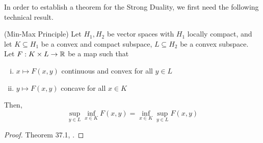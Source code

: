 \documentclass[../main.tex]{subfiles}
\begin{document}
In order to establish a theorem for the Strong Duality, we first need the following technical result.

\begin{lemma}
\label{lemma:min_max_principle}
    (Min-Max Principle) Let $H_1, H_2$ be vector spaces with $H_1$ locally compact, and let $K\subseteq H_1$ be a convex and compact subspace, $L\subseteq H_2$ be a convex subspace. Let $F: K\times L\to \mathbb{R}$ be a map such that
    \begin{enumerate}[(i)]
        \item $x\mapsto F(x, y)$ continuous and convex for all $y\in L$
        \item $y\mapsto F(x, y)$ concave for all $x\in K$
    \end{enumerate}
    Then, 
    $$
    \sup_{y\in L}\inf_{x\in K} F(x, y) = \inf_{x\in K}\sup_{y\in L} F(x, y)
    $$
\end{lemma}
\begin{proof}
    Theorem 37.1, \cite{rockafellar1997convex}.
\end{proof}
\end{document}
